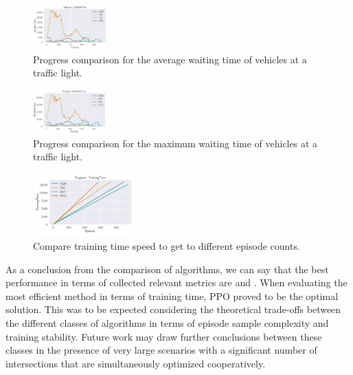 \documentclass[a4paper,twoside]{article}
\begin{document}
\begin{figure}[!h]
	\includegraphics[width=0.25\textwidth]{ev_progressAvgTime.png}
	\centering
	\caption{Progress comparison for the average waiting time of vehicles at a traffic light.}
	\label{fig:ev_progressAvgTime}
\end{figure}

\begin{figure}[!h]
	\includegraphics[width=0.25\textwidth]{ev_progressMaxTime.png}
	\centering
	\caption{Progress comparison for the maximum waiting time of vehicles at a traffic light.}
	\label{fig:ev_progressMaxTime}
\end{figure}


\begin{figure}[!h]
	\includegraphics[width=0.35\textwidth]{ev_trainingTime.png}
	\centering
	\caption{Compare training time speed to get to different episode counts.}
	\label{fig:ev_trainingTime}
\end{figure}

As a conclusion from the comparison of algorithms, we can say that the best performance in terms of collected relevant metrics are \cite{MnBA} and \cite{SAC}. When evaluating the most efficient method in terms of training time, PPO \cite{schulman2017proximal} proved to be the optimal solution. This was to be expected considering the theoretical trade-offs between the different classes of algorithms in terms of episode sample complexity and training stability. Future work may draw further conclusions between these classes in the presence of very large scenarios with a significant number of intersections that are simultaneously optimized cooperatively.
\end{document}
